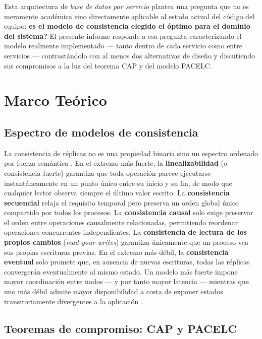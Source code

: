 \documentclass[12pt,letterpaper]{article}
\begin{document}
Esta arquitectura de \emph{base de datos por servicio} plantea una pregunta
que no es meramente acad\'emica sino directamente aplicable al estado
actual del c\'odigo del equipo: \textbf{\textquestiondown es el modelo de
consistencia elegido el \'optimo para el dominio del sistema?} El presente
informe responde a esa pregunta caracterizando el modelo realmente
implementado --- tanto dentro de cada servicio como entre servicios ---
contrast\'andolo con al menos dos alternativas de dise\~no y discutiendo sus
compromisos a la luz del teorema CAP y del modelo PACELC.

\section{Marco Te\'orico}

\subsection{Espectro de modelos de consistencia}

La consistencia de r\'eplicas no es una propiedad binaria sino un espectro
ordenado por fuerza sem\'antica \cite{viotti2016}. En el extremo m\'as
fuerte, la \textbf{linealizabilidad} (o consistencia fuerte) garantiza que
toda operaci\'on parece ejecutarse instant\'aneamente en un punto \'unico
entre su inicio y su fin, de modo que cualquier lector observa siempre el
\'ultimo valor escrito. La \textbf{consistencia secuencial} relaja el
requisito temporal pero preserva un orden global \'unico compartido por
todos los procesos. La \textbf{consistencia causal} solo exige preservar el
orden entre operaciones causalmente relacionadas, permitiendo reordenar
operaciones concurrentes independientes. La \textbf{consistencia de lectura
de los propios cambios} (\emph{read-your-writes}) garantiza \'unicamente
que un proceso vea sus propias escrituras previas. En el extremo m\'as
d\'ebil, la \textbf{consistencia eventual} solo promete que, en ausencia de
nuevas escrituras, todas las r\'eplicas converger\'an eventualmente al
mismo estado. Un modelo m\'as fuerte impone mayor coordinaci\'on entre
nodos --- y por tanto mayor latencia --- mientras que uno m\'as d\'ebil
admite mayor disponibilidad a costa de exponer estados transitoriamente
divergentes a la aplicaci\'on \cite{kleppmann2017}.

\subsection{Teoremas de compromiso: CAP y PACELC}
\end{document}
